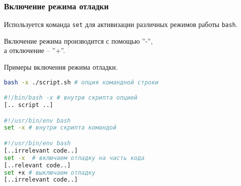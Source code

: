 \begin{frame}
	\frametitle{Включение режима отладки}
	Используется команда {\tt set} для активизации различных режимов работы {\tt bash}.

	Включение режима производится с помощью ''-'',\\
	а отключение -- ''+''.

	\begin{block}{Примеры включения режима отладки.}
		\begin{lstlisting}[language=sh,frame=single]
bash -x ./script.sh # опция командной строки

#!/bin/bash -x # внутри скрипта опцией
[.. script ..]

#!/usr/bin/env bash
set -x # внутри скрипта командой 

#!/usr/bin/env bash
[..irrelevant code..]
set -x  # включаем отладку на часть кода
[..relevant code..]  
set +x # выключаем отладку
[..irrelevant code..]
\end{lstlisting}
	\end{block}
\end{frame}
